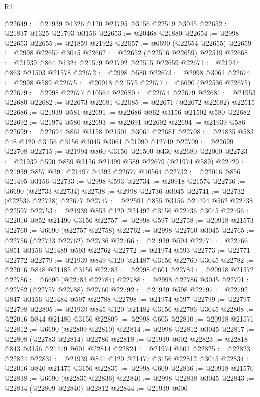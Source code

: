 \begin{lexlean}{R1}
\begin{coremodule}
@22649 := @21939 @1326 @120 @21795 @3156 @22519 @3045
@22652 := @21837 @1325 @21793 @3156
@22653 := @20468 @21880
@22654 := @2998 @22653
@22655 := @21859 @21922
@22657 := @6690 (@22654 @22655)
@22659 := @2998 @22657 @3045
@22662 := @22652 (@22516 @22659) @22519
@22668 := @21939 @864 @1324 @21579 @21792 @22515 @22659
@22671 := @21947 @863 @21503 @21578
@22672 := @2998 @580
@22673 := @2998 @3061
@22674 := @2998 @589
@22675 := @20918 @21575
@22677 := @6690 (@22536 @22675)
@22679 := @2998 @22677 @10564
@22680 := @22674 @22679
@22681 := @21953 @22680
@22682 := @22673 @22681
@22685 := @22671 (@22672 @22682) @22515
@22686 := @21939 @581
@22691 := @22686 @862 @3156 @21502 @580 @22682
@22692 := @21974 @580
@22693 := @22691 @22692
@22694 := @21939 @586
@22699 := @22694 @861 @3158 @21501 @3061 @22681
@22708 := @21835 @583 @48 @120 @3156 @3156 @3045 @3061 @21990 @12749
@22709 := @22699 @22708
@22715 := @21994 @860 @3156 @21500 @430 @22680 @22000
@22723 := @21939 @590 @859 @3156 @21499 @589 @22679 (@21974 @589)
@22729 := @21939 @857 @391 @21497 @4393 @22677 @10564
@22732 := @22016 @856 @21495 @3156
@22733 := @2998 @593
@22734 := @20918 @21574
@22736 := @6690 (@22733 @22734)
@22738 := @2998 @22736 @3045
@22741 := @22732 (@22536 @22738) @22677
@22747 := @22591 @855 @3156 @21494 @562 @22738 @22597
@22753 := @21939 @853 @120 @21492 @3156 @22736 @3045
@22756 := @22016 @852 @21490 @3156
@22757 := @2998 @597
@22758 := @20918 @21573
@22760 := @6690 (@22757 @22758)
@22762 := @2998 @22760 @3045
@22765 := @22756 (@22733 @22762) @22736
@22766 := @21939 @594
@22771 := @22766 @851 @3156 @21489 @593 @22762
@22772 := @21974 @593
@22773 := @22771 @22772
@22779 := @21939 @849 @120 @21487 @3156 @22760 @3045
@22782 := @22016 @848 @21485 @3156
@22783 := @2998 @601
@22784 := @20918 @21572
@22786 := @6690 (@22783 @22784)
@22788 := @2998 @22786 @3045
@22791 := @22782 (@22757 @22788) @22760
@22792 := @21939 @598
@22797 := @22792 @847 @3156 @21484 @597 @22788
@22798 := @21974 @597
@22799 := @22797 @22798
@22805 := @21939 @845 @120 @21482 @3156 @22786 @3045
@22808 := @22016 @844 @21480 @3156
@22809 := @2998 @605
@22810 := @20918 @21571
@22812 := @6690 (@22809 @22810)
@22814 := @2998 @22812 @3045
@22817 := @22808 (@22783 @22814) @22786
@22818 := @21939 @602
@22823 := @22818 @843 @3156 @21479 @601 @22814
@22824 := @21974 @601
@22825 := @22823 @22824
@22831 := @21939 @841 @120 @21477 @3156 @22812 @3045
@22834 := @22016 @840 @21475 @3156
@22835 := @2998 @609
@22836 := @20918 @21570
@22838 := @6690 (@22835 @22836)
@22840 := @2998 @22838 @3045
@22843 := @22834 (@22809 @22840) @22812
@22844 := @21939 @606

\end{coremodule}
\end{lexlean}
